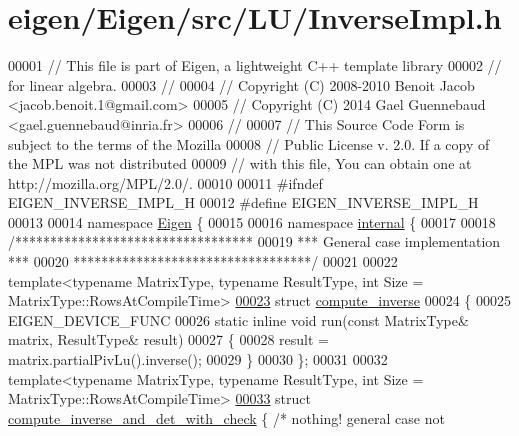 \hypertarget{eigen_2_eigen_2src_2_l_u_2_inverse_impl_8h_source}{}\section{eigen/\+Eigen/src/\+L\+U/\+Inverse\+Impl.h}
\label{eigen_2_eigen_2src_2_l_u_2_inverse_impl_8h_source}

\begin{DoxyCode}
00001 \textcolor{comment}{// This file is part of Eigen, a lightweight C++ template library}
00002 \textcolor{comment}{// for linear algebra.}
00003 \textcolor{comment}{//}
00004 \textcolor{comment}{// Copyright (C) 2008-2010 Benoit Jacob <jacob.benoit.1@gmail.com>}
00005 \textcolor{comment}{// Copyright (C) 2014 Gael Guennebaud <gael.guennebaud@inria.fr>}
00006 \textcolor{comment}{//}
00007 \textcolor{comment}{// This Source Code Form is subject to the terms of the Mozilla}
00008 \textcolor{comment}{// Public License v. 2.0. If a copy of the MPL was not distributed}
00009 \textcolor{comment}{// with this file, You can obtain one at http://mozilla.org/MPL/2.0/.}
00010 
00011 \textcolor{preprocessor}{#ifndef EIGEN\_INVERSE\_IMPL\_H}
00012 \textcolor{preprocessor}{#define EIGEN\_INVERSE\_IMPL\_H}
00013 
00014 \textcolor{keyword}{namespace }\hyperlink{namespace_eigen}{Eigen} \{ 
00015 
00016 \textcolor{keyword}{namespace }\hyperlink{namespaceinternal}{internal} \{
00017 
00018 \textcolor{comment}{/**********************************}
00019 \textcolor{comment}{*** General case implementation ***}
00020 \textcolor{comment}{**********************************/}
00021 
00022 \textcolor{keyword}{template}<\textcolor{keyword}{typename} MatrixType, \textcolor{keyword}{typename} ResultType, \textcolor{keywordtype}{int} Size = MatrixType::RowsAtCompileTime>
\hyperlink{struct_eigen_1_1internal_1_1compute__inverse}{00023} \textcolor{keyword}{struct }\hyperlink{struct_eigen_1_1internal_1_1compute__inverse}{compute\_inverse}
00024 \{
00025   EIGEN\_DEVICE\_FUNC
00026   \textcolor{keyword}{static} \textcolor{keyword}{inline} \textcolor{keywordtype}{void} run(\textcolor{keyword}{const} MatrixType& matrix, ResultType& result)
00027   \{
00028     result = matrix.partialPivLu().inverse();
00029   \}
00030 \};
00031 
00032 \textcolor{keyword}{template}<\textcolor{keyword}{typename} MatrixType, \textcolor{keyword}{typename} ResultType, \textcolor{keywordtype}{int} Size = MatrixType::RowsAtCompileTime>
\hyperlink{struct_eigen_1_1internal_1_1compute__inverse__and__det__with__check}{00033} \textcolor{keyword}{struct }\hyperlink{struct_eigen_1_1internal_1_1compute__inverse__and__det__with__check}{compute\_inverse\_and\_det\_with\_check} \{ \textcolor{comment}{/* nothing! general case not
}
\end{DoxyCode}
